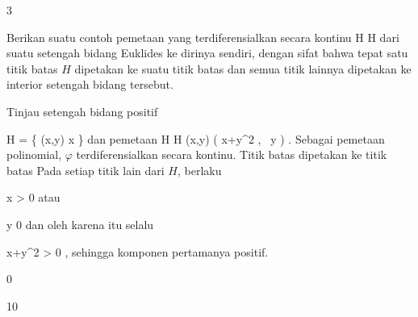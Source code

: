 {3}

{

Berikan suatu contoh pemetaan yang terdiferensialkan secara kontinu
\maabbdisp {\varphi} { H } { H
} {}
dari suatu setengah bidang Euklides ke dirinya sendiri, dengan sifat bahwa tepat satu titik batas $H$ dipetakan ke suatu titik batas dan semua titik lainnya dipetakan ke interior setengah bidang tersebut.

}
{

Tinjau setengah bidang positif

\mavergleichskettedisp
{\vergleichskette
{ H
}
{ =} { \left\{ (x,y)  \mid   x         \right\}
}
{ } {
}
{ } {
}
{ } {
}
}
{}{}{}
dan pemetaan
\maabbeledisp {\varphi} { H } {H
} {(x,y)} { \left(  x+y^2  , \,   y                   \right)
} {.}
Sebagai pemetaan polinomial, $\varphi$ terdiferensialkan secara kontinu. Titik batas
 dipetakan ke titik batas
 Pada setiap titik lain dari $H$, berlaku

\mavergleichskette
{\vergleichskette
{ x
}
{ > }{  0
}
{  }{
}
{    }{
}
{   }{
}
}
{}{}{}
atau

\mavergleichskette
{\vergleichskette
{ y
}
{ \neq }{ 0
}
{  }{
}
{    }{
}
{   }{
}
}
{}{}{}
dan oleh karena itu selalu

\mavergleichskettedisp
{\vergleichskette
{ x+y^2
}
{ >} {  0
}
{ } {
}
{ } {
}
{ } {
}
}
{}{}{,}
sehingga komponen pertamanya positif.

 }



{0}

{

}
{  }



{10}

